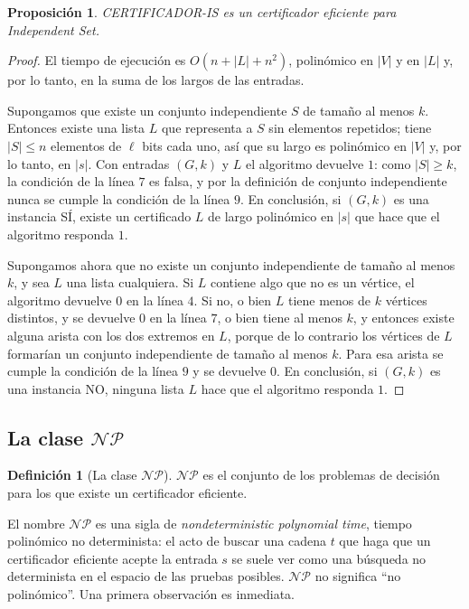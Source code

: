 \documentclass[12pt, spanish, oneside, openany]{book}
\newcommand{\NP}{\mathcal{NP}}
\newcommand{\prob}[1]{\textit{#1}}
\newcommand{\IS}{\prob{Independent Set}\xspace}
\newcommand{\alg}[1]{#1}
\theoremstyle{uprightplain}
\newtheorem{proposicion}[teorema]{Proposición}
\theoremstyle{definition}
\newtheorem{definicion}[teorema]{Definición}
\theoremstyle{remark}
\theoremstyle{definition}
\begin{document}
\begin{proposicion}
\label{prop:np-certificador-is}
\alg{CERTIFICADOR-IS} es un certificador eficiente para \IS.
\end{proposicion}
\begin{proof}
El tiempo de ejecución es $O(n+|L|+n^2)$, polinómico en $|V|$ y en $|L|$ y, por lo tanto, en la suma de los largos de las entradas.

Supongamos que existe un conjunto independiente $S$ de tamaño al menos $k$. Entonces existe una lista $L$ que representa a $S$ sin elementos repetidos; tiene $|S|\le n$ elementos de $\ell$ bits cada uno, así que su largo es polinómico en $|V|$ y, por lo tanto, en $|s|$. Con entradas $(G,k)$ y $L$ el algoritmo devuelve $1$: como $|S|\ge k$, la condición de la línea $7$ es falsa, y por la definición de conjunto independiente nunca se cumple la condición de la línea $9$. En conclusión, si $(G,k)$ es una instancia SÍ, existe un certificado $L$ de largo polinómico en $|s|$ que hace que el algoritmo responda $1$.

Supongamos ahora que no existe un conjunto independiente de tamaño al menos $k$, y sea $L$ una lista cualquiera. Si $L$ contiene algo que no es un vértice, el algoritmo devuelve $0$ en la línea $4$. Si no, o bien $L$ tiene menos de $k$ vértices distintos, y se devuelve $0$ en la línea $7$, o bien tiene al menos $k$, y entonces existe alguna arista con los dos extremos en $L$, porque de lo contrario los vértices de $L$ formarían un conjunto independiente de tamaño al menos $k$. Para esa arista se cumple la condición de la línea $9$ y se devuelve $0$. En conclusión, si $(G,k)$ es una instancia NO, ninguna lista $L$ hace que el algoritmo responda $1$.
\end{proof}

\subsection{\texorpdfstring{La clase $\NP$}{La clase NP}}

\begin{definicion}[La clase $\NP$]
\label{def:np-clase-np}
$\NP$ es el conjunto de los problemas de decisión para los que existe un certificador eficiente.
\end{definicion}

El nombre $\NP$ es una sigla de \emph{nondeterministic polynomial time}, tiempo polinómico no determinista: el acto de buscar una cadena $t$ que haga que un certificador eficiente acepte la entrada $s$ se suele ver como una búsqueda no determinista en el espacio de las pruebas posibles. $\NP$ no significa ``no polinómico''. Una primera observación es inmediata.
\end{document}
